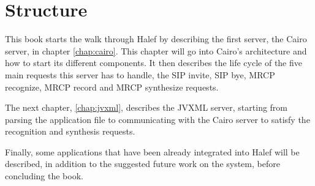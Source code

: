 \section{Structure}
This book starts the walk through Halef by describing the first server, the Cairo server, in chapter \ref{chap:cairo}.
This chapter will go into Cairo's architecture and how to start its different components.
It then describes the life cycle of the five main requests this server has to handle, the SIP invite, SIP bye, MRCP recognize, MRCP record and MRCP synthesize requests.
\par
The next chapter, \ref{chap:jvxml}, describes the JVXML server, starting from parsing the application file to communicating with the Cairo server to satisfy the recognition and synthesis requests.
\par
Finally, some applications that have been already integrated into Halef will be described, in addition to the suggested future work on the system, before concluding the book.
